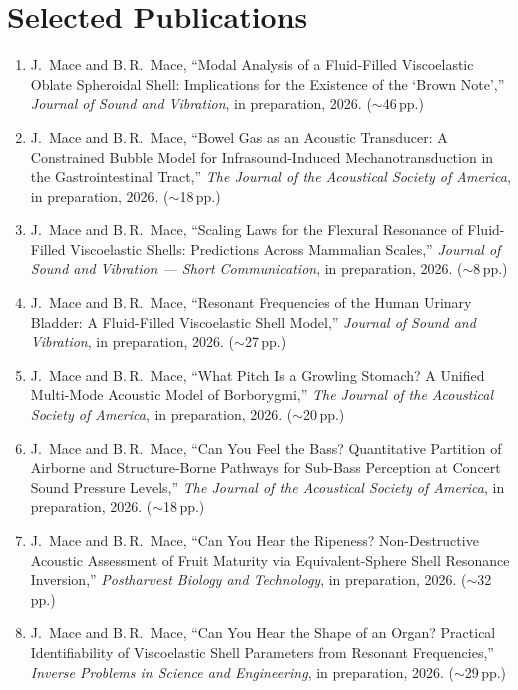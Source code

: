\documentclass[11pt,a4paper]{article}
\begin{document}
\section{Selected Publications}

\begin{enumerate}[leftmargin=*]
  \item J.~Mace and B.\,R.~Mace, ``Modal Analysis of a Fluid-Filled Viscoelastic Oblate Spheroidal Shell: Implications for the Existence of the `Brown Note','' \emph{Journal of Sound and Vibration}, in preparation, 2026. ($\sim$46\,pp.)

  \item J.~Mace and B.\,R.~Mace, ``Bowel Gas as an Acoustic Transducer: A Constrained Bubble Model for Infrasound-Induced Mechanotransduction in the Gastrointestinal Tract,'' \emph{The Journal of the Acoustical Society of America}, in preparation, 2026. ($\sim$18\,pp.)

  \item J.~Mace and B.\,R.~Mace, ``Scaling Laws for the Flexural Resonance of Fluid-Filled Viscoelastic Shells: Predictions Across Mammalian Scales,'' \emph{Journal of Sound and Vibration --- Short Communication}, in preparation, 2026. ($\sim$8\,pp.)

  \item J.~Mace and B.\,R.~Mace, ``Resonant Frequencies of the Human Urinary Bladder: A Fluid-Filled Viscoelastic Shell Model,'' \emph{Journal of Sound and Vibration}, in preparation, 2026. ($\sim$27\,pp.)

  \item J.~Mace and B.\,R.~Mace, ``What Pitch Is a Growling Stomach? A Unified Multi-Mode Acoustic Model of Borborygmi,'' \emph{The Journal of the Acoustical Society of America}, in preparation, 2026. ($\sim$20\,pp.)

  \item J.~Mace and B.\,R.~Mace, ``Can You Feel the Bass? Quantitative Partition of Airborne and Structure-Borne Pathways for Sub-Bass Perception at Concert Sound Pressure Levels,'' \emph{The Journal of the Acoustical Society of America}, in preparation, 2026. ($\sim$18\,pp.)

  \item J.~Mace and B.\,R.~Mace, ``Can You Hear the Ripeness? Non-Destructive Acoustic Assessment of Fruit Maturity via Equivalent-Sphere Shell Resonance Inversion,'' \emph{Postharvest Biology and Technology}, in preparation, 2026. ($\sim$32\,pp.)

  \item J.~Mace and B.\,R.~Mace, ``Can You Hear the Shape of an Organ? Practical Identifiability of Viscoelastic Shell Parameters from Resonant Frequencies,'' \emph{Inverse Problems in Science and Engineering}, in preparation, 2026. ($\sim$29\,pp.)


\end{enumerate}
\end{document}
